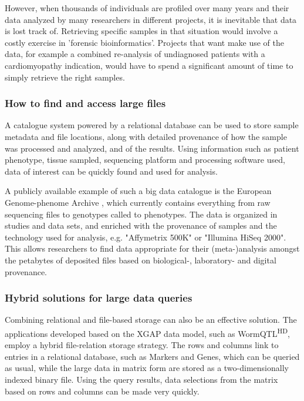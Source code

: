 However, when thousands of individuals are profiled over many years and their data analyzed by many researchers in different projects, it is inevitable that data is lost track of.
Retrieving specific samples in that situation would involve a costly exercise in 'forensic bioinformatics'.
Projects that want make use of the data, for example a combined re-analysis of undiagnosed patients with a cardiomyopathy indication, would have to spend a significant amount of time to simply retrieve the right samples.

\subsubsection*{How to find and access large files}

A catalogue system powered by a relational database can be used to store sample metadata and file locations, along with detailed provenance of how the sample was processed and analyzed, and of the results.
Using information such as patient phenotype, tissue sampled, sequencing platform and processing software used, data of interest can be quickly found and used for analysis.

A publicly available example of such a big data catalogue is the European Genome-phenome Archive \cite{Lappalainen_2015}, which currently contains everything from raw sequencing files to genotypes called to phenotypes.
The data is organized in studies and data sets, and enriched with the provenance of samples and the technology used for analysis, e.g. "Affymetrix 500K" or "Illumina HiSeq 2000".
This allows researchers to find data appropriate for their (meta-)analysis amongst the petabytes of deposited files based on biological-, laboratory- and digital provenance.

\subsubsection*{Hybrid solutions for large data queries}

Combining relational and file-based storage can also be an effective solution.
The applications developed based on the XGAP data model, such as WormQTL\textsuperscript{HD}, employ a hybrid file-relation storage strategy.
The rows and columns link to entries in a relational database, such as Markers and Genes, which can be queried as usual, while the large data in matrix form are stored as a two-dimensionally indexed binary file.
Using the query results, data selections from the matrix based on rows and columns can be made very quickly.

